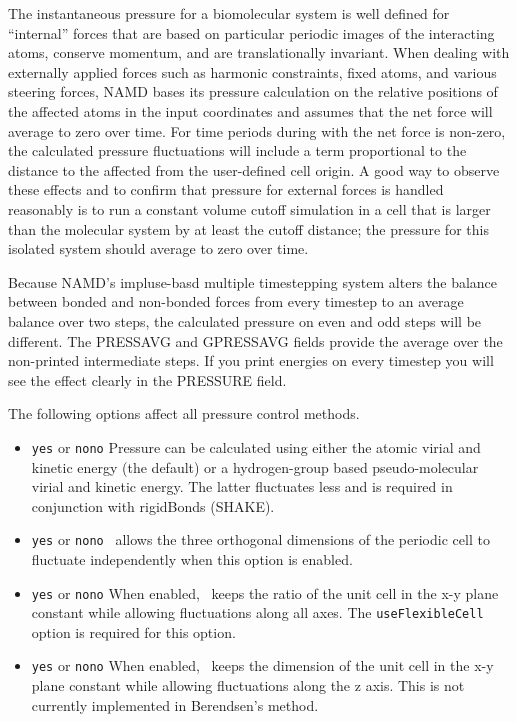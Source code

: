 The instantaneous pressure for a biomolecular system is well defined for
``internal'' forces that are based on particular periodic images of the
interacting atoms, conserve momentum, and are translationally invariant.
When dealing with externally applied forces such as harmonic constraints,
fixed atoms, and various steering forces, NAMD bases its pressure calculation
on the relative positions of the affected atoms in the input coordinates
and assumes that the net force will average to zero over time.  For time
periods during with the net force is non-zero, the calculated pressure
fluctuations will include a term proportional to the distance to the
affected from the user-defined cell origin.
A good way to observe these effects and to confirm that pressure for
external forces is handled reasonably is to run a constant volume cutoff
simulation in a cell that is larger than the molecular system by at least
the cutoff distance; the pressure for this isolated system should average
to zero over time.

Because NAMD's impluse-basd multiple timestepping system alters the
balance between bonded and non-bonded forces from every timestep to an
average balance over two steps, the calculated pressure on even and odd
steps will be different.  The PRESSAVG and GPRESSAVG fields provide the
average over the non-printed intermediate steps.  If you print energies on
every timestep you will see the effect clearly in the PRESSURE field.

The following options affect all pressure control methods.

\begin{itemize}

\item
{}
{{\tt yes} or {\tt no}}{{\tt no}}
{Pressure can be calculated using either the atomic virial and kinetic
energy (the default) or a hydrogen-group based pseudo-molecular
virial and kinetic energy.  The latter fluctuates less and is
required in conjunction with rigidBonds (SHAKE).}

\item
{}
{{\tt yes} or {\tt no}}{{\tt no}}
{\NAMD\ allows the three orthogonal dimensions of the periodic cell
to fluctuate independently when this option is enabled.}

\item
{}
{{\tt yes} or {\tt no}}{{\tt no}}
{When enabled, \NAMD\ keeps the ratio of the unit cell in the x-y plane 
constant while allowing fluctuations along all axes.  The {\tt useFlexibleCell} option is required for this option.}

\item
{}
{{\tt yes} or {\tt no}}{{\tt no}}
{When enabled, \NAMD\ keeps the dimension of the unit cell in the x-y plane 
constant while allowing fluctuations along the z axis.
This is not currently implemented in Berendsen's method.}

\end{itemize}

